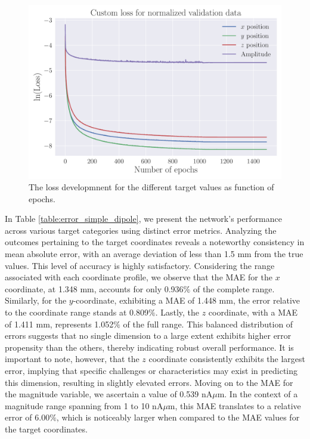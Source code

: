 \documentclass[a4paper, UKenglish, 11pt]{uiomaster}
\begin{document}
\begin{figure}[!htb]
    \centering
    \includegraphics[width=\linewidth]{figures/NN_magnitude/Custom_Loss_mse_targets_amplitudes_test_custom_loss_tanh_32_0.001_0.35_0.1_0_1500_(0).pdf}
    \caption{The loss developmnent for the different target values as function of epochs.}
    \label{fig:dipole_w_amplitude_targets}
\end{figure}

In Table \ref{table:error_simple_dipole}, we present the network's performance across various target categories using distinct error metrics. Analyzing the outcomes pertaining to the target coordinates reveals a noteworthy consistency in mean absolute error, with an average deviation of less than 1.5 mm from the true values. This level of accuracy is highly satisfactory. Considering the range associated with each coordinate profile, we observe that the MAE for the $x$ coordinate, at 1.348 mm, accounts for only 0.936$\%$ of the complete range. Similarly, for the $y$-coordinate, exhibiting a MAE of 1.448 mm, the error relative to the coordinate range stands at 0.809$\%$. Lastly, the $z$ coordinate, with a MAE of 1.411 mm, represents 1.052$\%$ of the full range. This balanced distribution of errors suggests that no single dimension to a large extent exhibits higher error propensity than the others, thereby indicating robust overall performance. It is important to note, however, that the $z$ coordinate consistently exhibits the largest error, implying that specific challenges or characteristics may exist in predicting this dimension, resulting in slightly elevated errors. Moving on to the MAE for the magnitude variable, we ascertain a value of 0.539 nA$\mu$m. In the context of a magnitude range spanning from 1 to 10 nA$\mu$m, this MAE translates to a relative error of 6.00$\%$, which is noticeably larger when compared to the MAE values for the target coordinates.
\end{document}
